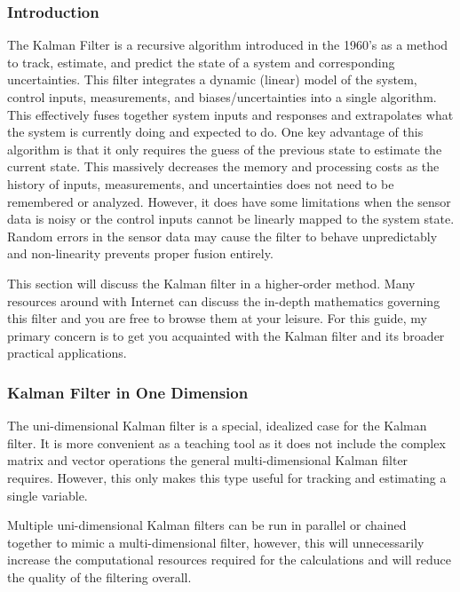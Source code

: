         \subsubsection*{Introduction} 
        The Kalman Filter is a recursive algorithm introduced in the 1960's as a method to track, estimate, and predict the state of a system and corresponding uncertainties.
        This filter integrates a dynamic (linear) model of the system, control inputs, measurements, and biases/uncertainties into a single algorithm.
        This effectively fuses together system inputs and responses and extrapolates what the system is currently doing and expected to do.
        One key advantage of this algorithm is that it only requires the guess of the previous state to estimate the current state. 
        This massively decreases the memory and processing costs as the history of inputs, measurements, and uncertainties does not need to be remembered or analyzed.
        However, it does have some limitations when the sensor data is noisy or the control inputs cannot be linearly mapped to the system state.
        Random errors in the sensor data may cause the filter to behave unpredictably and non-linearity prevents proper fusion entirely.

        This section will discuss the Kalman filter in a higher-order method.
        Many resources around with Internet can discuss the in-depth mathematics governing this filter and you are free to browse them at your leisure. 
        For this guide, my primary concern is to get you acquainted with the Kalman filter and its broader practical applications.

        \subsubsection*{Kalman Filter in One Dimension}
        The uni-dimensional Kalman filter is a special, idealized case for the Kalman filter.
        It is more convenient as a teaching tool as it does not include the complex matrix and vector operations the general multi-dimensional Kalman filter requires.
        However, this only makes this type useful for tracking and estimating a single variable.

        Multiple uni-dimensional Kalman filters can be run in parallel or chained together to mimic a multi-dimensional filter, however, this will unnecessarily increase the computational resources required for the calculations and will reduce the quality of the filtering overall.

